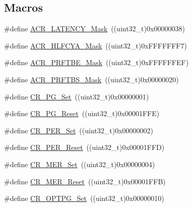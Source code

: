 \subsection*{Macros}
\begin{DoxyCompactItemize}
\item 
\#define \hyperlink{group___f_l_a_s_h___private___defines_ga5f1112c5731f01b063fdf2461efbedf7}{A\+C\+R\+\_\+\+L\+A\+T\+E\+N\+C\+Y\+\_\+\+Mask}~((uint32\+\_\+t)0x00000038)
\item 
\#define \hyperlink{group___f_l_a_s_h___private___defines_ga6b6f73163f3a90f5072b6b7dc9fb63b7}{A\+C\+R\+\_\+\+H\+L\+F\+C\+Y\+A\+\_\+\+Mask}~((uint32\+\_\+t)0x\+F\+F\+F\+F\+F\+F\+F7)
\item 
\#define \hyperlink{group___f_l_a_s_h___private___defines_gaf95fa450690ce94c4f4357e4dd72791a}{A\+C\+R\+\_\+\+P\+R\+F\+T\+B\+E\+\_\+\+Mask}~((uint32\+\_\+t)0x\+F\+F\+F\+F\+F\+F\+E\+F)
\item 
\#define \hyperlink{group___f_l_a_s_h___private___defines_ga257768fe5d61ac49f43b6b90ba413102}{A\+C\+R\+\_\+\+P\+R\+F\+T\+B\+S\+\_\+\+Mask}~((uint32\+\_\+t)0x00000020)
\item 
\#define \hyperlink{group___f_l_a_s_h___private___defines_gaf4fdb45c4a4d30dcddc389ec920f720f}{C\+R\+\_\+\+P\+G\+\_\+\+Set}~((uint32\+\_\+t)0x00000001)
\item 
\#define \hyperlink{group___f_l_a_s_h___private___defines_gadda1a996e1867e911aaa7b0f30eb6834}{C\+R\+\_\+\+P\+G\+\_\+\+Reset}~((uint32\+\_\+t)0x00001\+F\+F\+E)
\item 
\#define \hyperlink{group___f_l_a_s_h___private___defines_ga6e5e45c62f559102546b40de50c700bd}{C\+R\+\_\+\+P\+E\+R\+\_\+\+Set}~((uint32\+\_\+t)0x00000002)
\item 
\#define \hyperlink{group___f_l_a_s_h___private___defines_gad564767c401a1a9c36b71342448fd256}{C\+R\+\_\+\+P\+E\+R\+\_\+\+Reset}~((uint32\+\_\+t)0x00001\+F\+F\+D)
\item 
\#define \hyperlink{group___f_l_a_s_h___private___defines_ga7e5cf18b31b5ed960cd05a816cadf973}{C\+R\+\_\+\+M\+E\+R\+\_\+\+Set}~((uint32\+\_\+t)0x00000004)
\item 
\#define \hyperlink{group___f_l_a_s_h___private___defines_gabed855f33ff965c530c2b09a49a987f5}{C\+R\+\_\+\+M\+E\+R\+\_\+\+Reset}~((uint32\+\_\+t)0x00001\+F\+F\+B)
\item 
\#define \hyperlink{group___f_l_a_s_h___private___defines_ga84ec77ffaa2a83edeef385e3a36171f8}{C\+R\+\_\+\+O\+P\+T\+P\+G\+\_\+\+Set}~((uint32\+\_\+t)0x00000010)
\item 

\end{DoxyCompactItemize}
